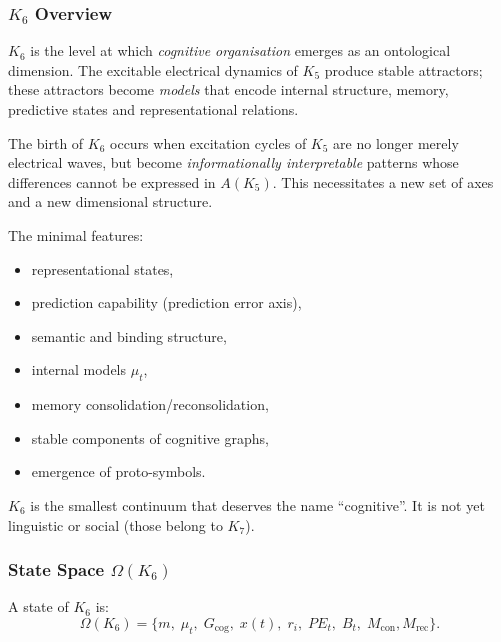 

\subsubsection{\texorpdfstring{$K_6$}{K_6} Overview}
\label{sec:k6-overview}

$K_6$ is the level at which \emph{cognitive organisation} emerges as an
ontological dimension. The excitable electrical dynamics of $K_5$
produce stable attractors; these attractors become \emph{models} that
encode internal structure, memory, predictive states and representational
relations.

The birth of $K_6$ occurs when excitation cycles of $K_5$ are no longer
merely electrical waves, but become \emph{informationally interpretable}
patterns whose differences cannot be expressed in $A(K_5)$. This
necessitates a new set of axes and a new dimensional structure.

The minimal features:
\begin{itemize}
    \item representational states,
    \item prediction capability (prediction error axis),
    \item semantic and binding structure,
    \item internal models $\mu_t$,
    \item memory consolidation/reconsolidation,
    \item stable components of cognitive graphs,
    \item emergence of proto-symbols.
\end{itemize}

$K_6$ is the smallest continuum that deserves the name ``cognitive''. It
is not yet linguistic or social (those belong to $K_7$).

\subsubsection{State Space \texorpdfstring{$\Omega(K_6)$}{\Omega(K_6)}}

A state of $K_6$ is:
\[
\Omega(K_6) = 
\{
m,\; \mu_t,\; G_{\mathrm{cog}},\;
x(t),\; r_i,\;
PE_t,\; B_t,\;
M_{\mathrm{con}}, M_{\mathrm{rec}}
\}.
\]


